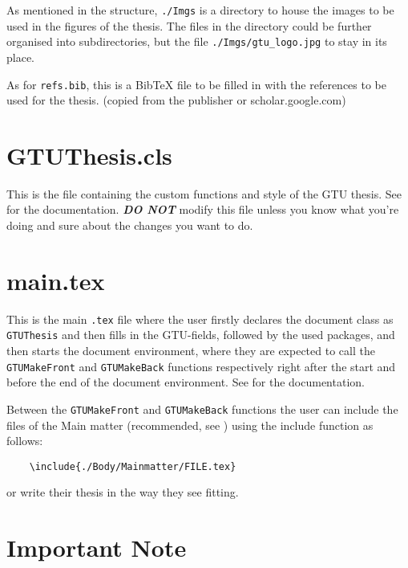 As mentioned in the structure, \texttt{./Imgs} is a directory to house the images to be used in the figures of the thesis. The files in the directory could be further organised into subdirectories, but the file \texttt{./Imgs/gtu\_logo.jpg} to stay in its place.

As for \texttt{refs.bib}, this is a BibTeX file to be filled in with the references to be used for the thesis. (copied from the publisher or scholar.google.com)

\section{GTUThesis.cls}\label{sec:cls}

This is the file containing the custom functions and style of the GTU thesis. See  for the documentation. \textbf{\textit{DO NOT}} modify this file unless you know what you're doing and sure about the changes you want to do.

\section{main.tex}\label{sec:maintex}

This is the main \texttt{.tex} file where the user firstly declares the document class as \texttt{GTUThesis} and then fills in the GTU-fields, followed by the used packages, and then starts the document environment, where they are expected to call the \texttt{GTUMakeFront} and \texttt{GTUMakeBack} functions respectively right after the start and before the end of the document environment. See  for the documentation.

Between the \texttt{GTUMakeFront} and \texttt{GTUMakeBack} functions the user can include the files of the Main matter (recommended, see ) using the include function as follows:

	\texttt{~~~~\textbackslash include\{./Body/Mainmatter/FILE.tex\}}

or write their thesis in the way they see fitting.

\section{Important Note}

